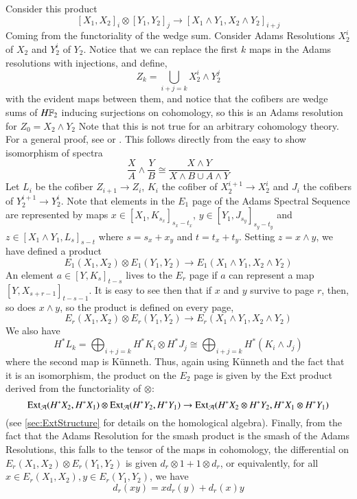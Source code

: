 Consider this product
\[[X_1,X_2]_i\otimes[Y_1,Y_2]_j\to [X_1\wedge Y_1,X_2\wedge Y_2]_{i+j}\]
Coming from the functoriality of the wedge sum.  
Consider Adams Resolutions $X_2^{i}$ of $X_2$ and $Y_2^i$ of $Y_2$.  
Notice that we can replace the first $k$ maps in the Adams resolutions with injections, and define,
\[Z_k=\bigcup_{i+j=k} X_2^i\wedge Y_2^j\]
with the evident maps between them, and notice that the cofibers are wedge sums of $H\mathbb{F}_2$ inducing surjections on cohomology, so this is an Adams resolution for $Z_0=X_2\wedge Y_2$ Note that this is not true for an arbitrary cohomology theory. For a general proof, see \cite[Ch~2.3]{RavenelGreen} or \cite[Ch~IV]{H00RingSpectra}.   
This follows directly from the easy to show isomorphism of spectra
\[\frac{X}{A}\wedge \frac{Y}{B}\cong\frac{X\wedge Y}{X\wedge B\cup A\wedge Y}\]
Let $L_i$ be the cofiber $Z_{i+1}\to Z_i$, $K_i$ the cofiber of $X_2^{i+1}\to X_2^i$ and $J_i$ the cofibers of  $Y_2^{i+1}\to Y_2^i$.
Note that elements in the $E_1$ page of the Adams Spectral Sequence are represented by maps $x\in [X_1,K_{s_x}]_{s_x-t_x}$, $y\in [Y_1,J_{s_y}]_{s_y-t_y}$ and $z\in [X_1\wedge Y_1,L_s]_{s-t}$ where $s=s_x+x_y$ and $t=t_x+t_y$.  Setting $z=x\wedge y$, we have defined a product
\[E_1(X_1,X_2)\otimes E_1(Y_1,Y_2)\to E_1(X_1\wedge Y_1,X_2\wedge Y_2)\]
An element $a\in [Y,K_s]_{t-s}$ lives to the $E_r$ page if $a$ can represent a map $[Y,X_{s+r-1}]_{t-s-1}$.  
It is easy to see then that if $x$ and $y$ survive to page $r$, then, so does $x\wedge y$, so the product is defined on every page,  
\[E_r(X_1,X_2)\otimes E_r(Y_1,Y_2)\to E_r(X_1\wedge Y_1,X_2\wedge Y_2)\]
We also have
\[H^*L_k=\bigoplus_{i+j=k} H^*K_i\otimes H^*J_j\cong\bigoplus_{i+j=k} H^*(K_i\wedge J_j)\]
where the second map is K\"{u}nneth. 
Thus, again using K\"{u}nneth and the fact that it is an isomorphism, the product on the $E_2$ page is given by the Ext product derived from the functoriality of $\otimes$:
\[\operatorname{Ext}\nolimits_{\mathcal{A}}(H^*X_2,H^*X_1)\otimes \operatorname{Ext}\nolimits_{\mathcal{A}}(H^*Y_2,H^*Y_1)\to \operatorname{Ext}\nolimits_{\mathcal{A}}(H^*X_2\otimes H^*Y_2,H^*X_1\otimes H^*Y_1)\]
(see \ref{sec:ExtStructure} for details on the homological algebra).  
Finally, from the fact that the Adams Resolution for the smash product is the smash of the Adams Resolutions, this falls to the tensor of the maps in cohomology, the differential on $E_r(X_1,X_2)\otimes E_r(Y_1,Y_2)$ is given $d_r\otimes 1+1\otimes d_r$, or equivalently, for all $x\in E_r(X_1,X_2),y\in  E_r(Y_1,Y_2)$, we have
\[d_r(xy)=xd_r(y)+d_r(x)y\]

